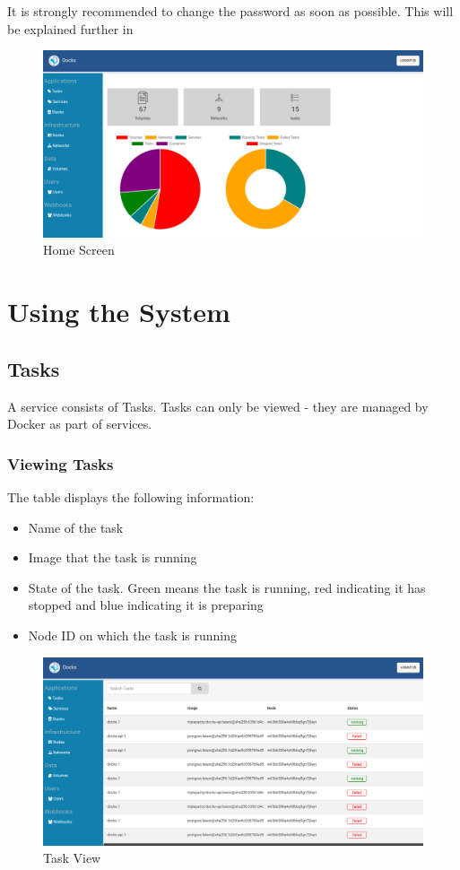 \documentclass[]{article}
\providecommand{\tightlist}{%
	\setlength{\itemsep}{0pt}\setlength{\parskip}{0pt}}
\begin{document}
It is strongly recommended to change the password as soon as possible.
This will be explained further in 

\begin{figure}[H]
	\centering
	\includegraphics[scale=0.4]{home.png}
	\caption{Home Screen}
\end{figure}

\section{Using the System}


\subsection{Tasks}
A service consists of Tasks. Tasks can only be viewed - they are managed by Docker
as part of services.

\subsubsection{Viewing Tasks}
The table displays the following information:
\begin{itemize}
	\tightlist
	\item Name of the task
	\item Image that the task is running
	\item State of the task.
	Green means the task is running, 
	red indicating it has stopped and blue indicating it is preparing
	\item Node ID on which the task is running
\end{itemize}

\begin{figure}[H]
	\centering
	\includegraphics[scale=0.4]{tasks.png}
	\caption{Task View}
\end{figure}
\end{document}
